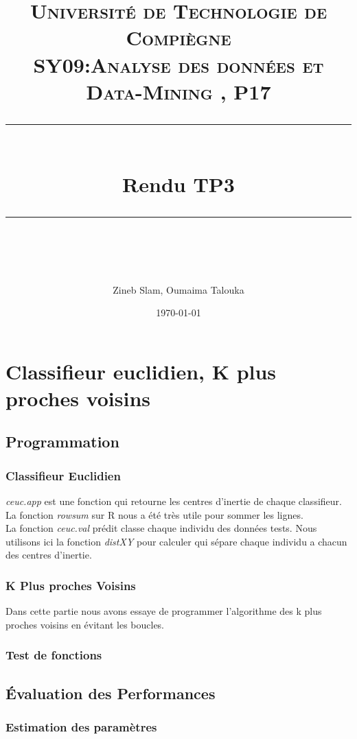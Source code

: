 \documentclass[10pt]{article}
\title{
	\normalfont \normalsize 
	\textsc{Université de Technologie de Compiègne\\ 
		SY09:Analyse des données et Data-Mining , P17} \\
	[10pt] 
	\rule{\linewidth}{0.5pt} \\[6pt] 
	\huge Rendu TP3\\
	\rule{\linewidth}{2pt}  \\[10pt]
}
\author{Zineb Slam, Oumaima Talouka}
\date{\normalsize \today}
\begin{document}
	{\let\newpage\relax\maketitle}	
	
		
	
	\section{Classifieur euclidien, K plus proches voisins}
		\subsection{ Programmation}
		\subsubsection{Classifieur Euclidien}
	\textit{ceuc.app }est une fonction qui retourne les centres d'inertie de chaque classifieur. La fonction \textit{rowsum} sur R nous a été très utile pour sommer les lignes.\\
	La fonction \textit{ceuc.val}  prédit classe chaque individu des données tests. Nous utilisons ici la fonction \textit{distXY} pour calculer qui sépare chaque individu a chacun des centres d'inertie.
	
	\subsubsection{K Plus proches Voisins}
		Dans cette partie nous avons essaye  de programmer l'algorithme des k plus proches voisins en évitant les boucles.
	
		\subsubsection{ Test de fonctions}
		
			\subsection{ Évaluation des Performances}
			
			\subsubsection{Estimation des paramètres}
			
\end{document}

